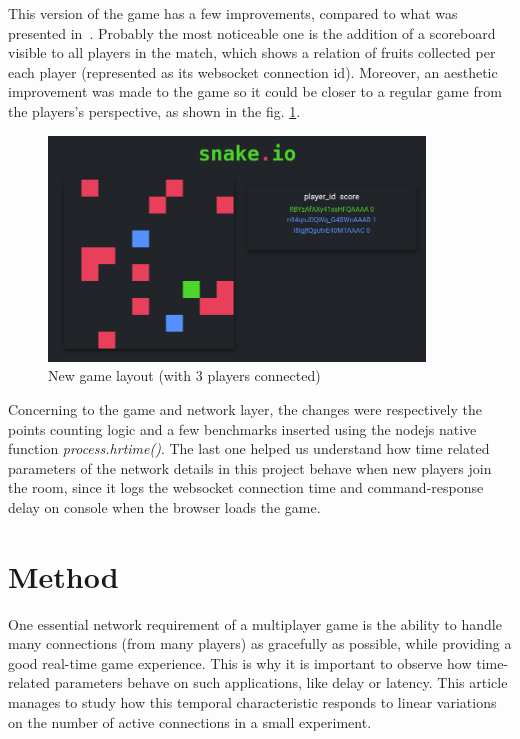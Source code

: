 \documentclass[english]{sbrt}
\begin{document}
This version of the game has a few improvements, compared to what was presented in~\cite{previous}. Probably the most noticeable one is the addition of a scoreboard visible to all players in the match, which shows a relation of fruits collected per each player (represented as its websocket connection id). Moreover, an aesthetic improvement was made to the game so it could be closer to a regular game from the players's perspective, as shown in the fig. \ref{screen}.

\begin{figure}[H]
  \centering
  \includegraphics[width=10cm]{graphs/screen.png}
  \caption{New game layout (with 3 players connected)}
  \label{screen}
\end{figure}

Concerning to the game and network layer, the changes were respectively the points counting logic and
a few benchmarks inserted using the nodejs native function \textit{process.hrtime()}. The last one helped us understand how time related parameters of the network details in this project behave when
new players join the room, since it logs the websocket connection time and command-response delay on console when the browser loads the game.

\section{\textbf{Method}}

One essential network requirement of a multiplayer game is the ability to handle many connections (from many players) as gracefully as possible, while providing a good real-time game experience. This is why it is important to observe how time-related parameters behave on such applications, like delay or latency. This article manages to study how this temporal characteristic responds to linear variations on the number of active connections in a small experiment.
\end{document}
